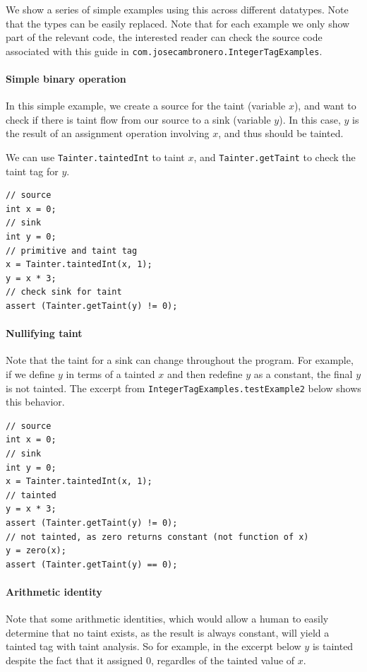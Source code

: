 \documentclass[a4paper]{article}
\begin{document}
We show a series of simple examples using this across different datatypes. Note that the types 
can be easily replaced. Note that for each example we only show part of the relevant code,
the interested reader can check the source code associated with this guide
in \verb|com.josecambronero.IntegerTagExamples|.

\paragraph{Simple binary operation}
In this simple example, we create a source for the taint (variable $x$), and want to check
if there is taint flow from our source to a sink (variable $y$). In this case, $y$ is the result
of an assignment operation involving $x$, and thus should be tainted.

We can use \verb|Tainter.taintedInt| to taint $x$, and \verb|Tainter.getTaint| to check the taint
tag for $y$.

\begin{lstlisting}
// source
int x = 0;
// sink
int y = 0;
// primitive and taint tag
x = Tainter.taintedInt(x, 1);
y = x * 3;
// check sink for taint
assert (Tainter.getTaint(y) != 0);
\end{lstlisting}



\paragraph{Nullifying taint}
Note that the taint for a sink can change throughout the program. For example,
if we define $y$ in terms of a tainted $x$ and then redefine $y$ as a constant, the final $y$
is not tainted. The excerpt from \verb|IntegerTagExamples.testExample2|  below
shows this behavior.

\begin{lstlisting}
// source
int x = 0;
// sink
int y = 0;
x = Tainter.taintedInt(x, 1);
// tainted
y = x * 3;
assert (Tainter.getTaint(y) != 0);
// not tainted, as zero returns constant (not function of x)
y = zero(x);
assert (Tainter.getTaint(y) == 0);
\end{lstlisting}


\paragraph{Arithmetic identity}
Note that some arithmetic identities, which would allow a human to easily determine that no
taint exists, as the result is always constant, will yield a tainted tag with taint analysis.
So for example, in the excerpt below $y$ is tainted despite the fact that it assigned 0, regardles
of the tainted value of $x$.
\end{document}
